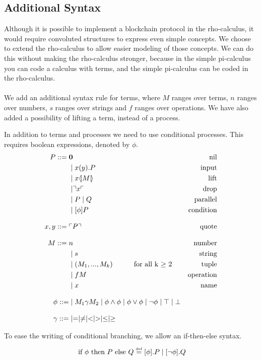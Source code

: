 

\subsection{Additional Syntax} \label{sec:addsyntax}
Although it is possible to implement a blockchain protocol in the rho-calculus, it would require convoluted structures to express even simple concepts.
We choose to extend the rho-calculus to allow easier modeling of those concepts.
We can do this without making the rho-calculus stronger, because in the simple pi-calculus you can code a calculus with terms\citep{Baldamus2005}, and the simple pi-calculus can be coded in the rho-calculus\citep{Meredith2005}.\\
\\
We add an additional syntax rule for terms, where $M$ ranges over terms, $n$ ranges over numbers, $s$ ranges over strings and $f$ ranges over operations. We have also added a possibility of lifting a term, instead of a process.

In addition to terms and processes we need to use conditional processes. This requires boolean expressions, denoted by \ensuremath{\phi}.
\begin{align*}
P  ::= \; &  \mathbf{0} & \text{nil} \\
      & \mid x(y).P & \text{input} \\
	  & \mid x \langle \! | M | \! \rangle&\text{lift}\\
      & \mid \urcorner x \ulcorner & \text{drop} \\
      & \mid P \mid Q & \text{parallel} \\
      & \mid [\phi] P & \text{condition} \\[3mm]
    x,y ::= \; & \ulcorner P \urcorner & \text{quote}\\[3mm]
M::=\; & n &\text{number}\\
 	  &\mid s &\text{string}\\
 	  &\mid (M_1,...,M_k)\quad\quad\quad \text{for all k $\geq$ 2} &\text{tuple}\\
 	  &\mid fM &\text{operation}\\
 	  &\mid x &\text{name}\\[3mm]
\phi ::=& \mid M_1\gamma M_2 \mid \phi\land\phi \mid \phi\lor\phi \mid \neg\phi \mid \top \mid \bot\\[3mm]
\gamma ::=& \mid = \mid \neq \mid < \mid > \mid \leq \mid \geq
\end{align*}

To ease the writing of conditional branching, we allow an if-then-else syntax.
\begin{align*}
	\text{ if }\phi\text{ then }P\text{ else }Q \overset{\underset{\mathrm{def}}{}}{=} [\phi].P \mid [\neg \phi].Q
\end{align*}


